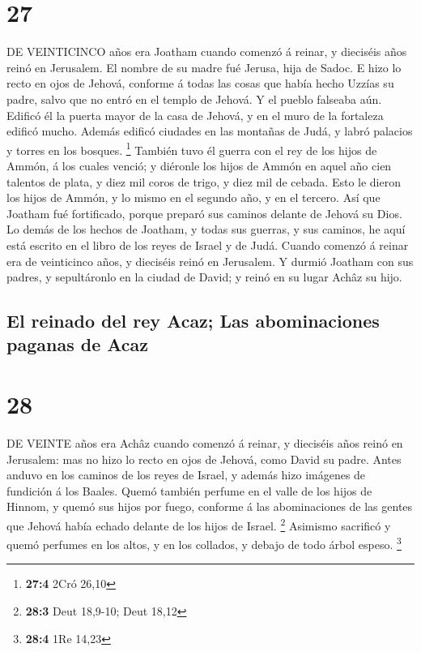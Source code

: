 \hypertarget{section-26}{%
\section{27}\label{section-26}}

 DE VEINTICINCO años era Joatham cuando comenzó á reinar, y
dieciséis años reinó en Jerusalem. El nombre de su madre fué Jerusa,
hija de Sadoc.  E hizo lo recto en ojos de Jehová, conforme
á todas las cosas que había hecho Uzzías su padre, salvo que no entró en
el templo de Jehová. Y el pueblo falseaba aún.  Edificó él
la puerta mayor de la casa de Jehová, y en el muro de la fortaleza
edificó mucho.  Además edificó ciudades en las montañas de
Judá, y labró palacios y torres en los bosques. \footnote{\textbf{27:4}
  2Cró 26,10}  También tuvo él guerra con el rey de los
hijos de Ammón, á los cuales venció; y diéronle los hijos de Ammón en
aquel año cien talentos de plata, y diez mil coros de trigo, y diez mil
de cebada. Esto le dieron los hijos de Ammón, y lo mismo en el segundo
año, y en el tercero.  Así que Joatham fué fortificado,
porque preparó sus caminos delante de Jehová su Dios.  Lo
demás de los hechos de Joatham, y todas sus guerras, y sus caminos, he
aquí está escrito en el libro de los reyes de Israel y de Judá.
 Cuando comenzó á reinar era de veinticinco años, y
dieciséis reinó en Jerusalem.  Y durmió Joatham con sus
padres, y sepultáronlo en la ciudad de David; y reinó en su lugar Achâz
su hijo.

\hypertarget{el-reinado-del-rey-acaz-las-abominaciones-paganas-de-acaz}{%
\subsection{El reinado del rey Acaz; Las abominaciones paganas de
Acaz}\label{el-reinado-del-rey-acaz-las-abominaciones-paganas-de-acaz}}

\hypertarget{section-27}{%
\section{28}\label{section-27}}

 DE VEINTE años era Achâz cuando comenzó á reinar, y
dieciséis años reinó en Jerusalem: mas no hizo lo recto en ojos de
Jehová, como David su padre.  Antes anduvo en los caminos de
los reyes de Israel, y además hizo imágenes de fundición á los Baales.
 Quemó también perfume en el valle de los hijos de Hinnom, y
quemó sus hijos por fuego, conforme á las abominaciones de las gentes
que Jehová había echado delante de los hijos de Israel. \footnote{\textbf{28:3}
  Deut 18,9-10; Deut 18,12}  Asimismo sacrificó y quemó
perfumes en los altos, y en los collados, y debajo de todo árbol espeso.
\footnote{\textbf{28:4} 1Re 14,23}

